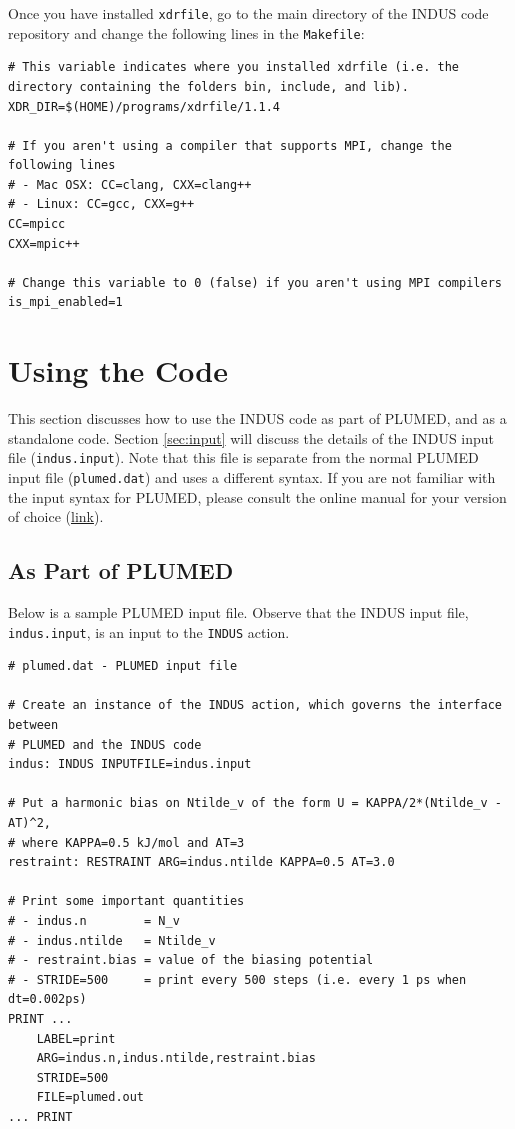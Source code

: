\documentclass[11pt,notitlepage]{article}
\newcommand{\plumedmanual}[1][link]{\href{https://plumed.github.io/doc.html}{#1}}
\begin{document}
Once you have installed \texttt{xdrfile}, go to the main directory of the INDUS code repository and change the following lines in the \texttt{Makefile}:

\begin{lstlisting}[mathescape=false]
# This variable indicates where you installed xdrfile (i.e. the directory containing the folders bin, include, and lib).
XDR_DIR=$(HOME)/programs/xdrfile/1.1.4

# If you aren't using a compiler that supports MPI, change the following lines
# - Mac OSX: CC=clang, CXX=clang++
# - Linux: CC=gcc, CXX=g++
CC=mpicc
CXX=mpic++

# Change this variable to 0 (false) if you aren't using MPI compilers
is_mpi_enabled=1
\end{lstlisting}


\section{Using the Code}


This section discusses how to use the INDUS code as part of PLUMED, and as a standalone code. Section \ref{sec:input} will discuss the details of the INDUS input file (\texttt{indus.input}). Note that this file is separate from the normal PLUMED input file (\texttt{plumed.dat}) and uses a different syntax. If you are not familiar with the input syntax for PLUMED, please consult the online manual for your version of choice (\plumedmanual).


\subsection{As Part of PLUMED}

Below is a sample PLUMED input file. Observe that the INDUS input file, \texttt{indus.input}, is an input to the \texttt{INDUS} action.

\begin{lstlisting}
# plumed.dat - PLUMED input file

# Create an instance of the INDUS action, which governs the interface between
# PLUMED and the INDUS code
indus: INDUS INPUTFILE=indus.input

# Put a harmonic bias on Ntilde_v of the form U = KAPPA/2*(Ntilde_v - AT)^2,
# where KAPPA=0.5 kJ/mol and AT=3
restraint: RESTRAINT ARG=indus.ntilde KAPPA=0.5 AT=3.0

# Print some important quantities
# - indus.n        = N_v
# - indus.ntilde   = Ntilde_v
# - restraint.bias = value of the biasing potential
# - STRIDE=500     = print every 500 steps (i.e. every 1 ps when dt=0.002ps)
PRINT ...
	LABEL=print
	ARG=indus.n,indus.ntilde,restraint.bias
	STRIDE=500
	FILE=plumed.out
... PRINT
\end{lstlisting}
\end{document}
